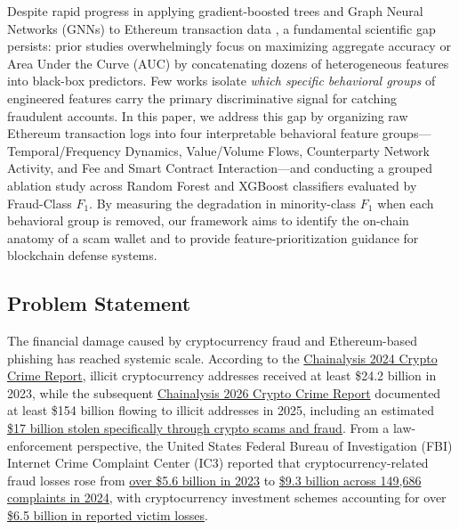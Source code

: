 \documentclass[conference]{IEEEtran}
\begin{document}
Despite rapid progress in applying gradient-boosted trees and Graph Neural Networks (GNNs) to Ethereum transaction data \cite{chen2020ijcai, li2022, zhang2024}, a fundamental scientific gap persists: prior studies overwhelmingly focus on maximizing aggregate accuracy or Area Under the Curve (AUC) by concatenating dozens of heterogeneous features into black-box predictors. Few works isolate \emph{which specific behavioral groups} of engineered features carry the primary discriminative signal for catching fraudulent accounts. In this paper, we address this gap by organizing raw Ethereum transaction logs into four interpretable behavioral feature groups---Temporal/Frequency Dynamics, Value/Volume Flows, Counterparty Network Activity, and Fee and Smart Contract Interaction---and conducting a grouped ablation study across Random Forest and XGBoost classifiers evaluated by Fraud-Class $F_1$. By measuring the degradation in minority-class $F_1$ when each behavioral group is removed, our framework aims to identify the on-chain anatomy of a scam wallet and to provide feature-prioritization guidance for blockchain defense systems.

\subsection{Problem Statement}
The financial damage caused by cryptocurrency fraud and Ethereum-based phishing has reached systemic scale. According to the \href{https://www.chainalysis.com/blog/2024-crypto-crime-report-introduction/}{Chainalysis 2024 Crypto Crime Report}, illicit cryptocurrency addresses received at least \$24.2 billion in 2023, while the subsequent \href{https://www.chainalysis.com/blog/2026-crypto-crime-report-introduction/}{Chainalysis 2026 Crypto Crime Report} documented at least \$154 billion flowing to illicit addresses in 2025, including an estimated \href{https://www.chainalysis.com/blog/crypto-scams-2026/}{\$17 billion stolen specifically through crypto scams and fraud}. From a law-enforcement perspective, the United States Federal Bureau of Investigation (FBI) Internet Crime Complaint Center (IC3) reported that cryptocurrency-related fraud losses rose from \href{https://www.fbi.gov/news/stories/2023-cryptocurrency-fraud-report-released}{over \$5.6 billion in 2023} to \href{https://www.trmlabs.com/resources/blog/a-record-breaking-year-for-cybercrime-key-findings-from-the-fbis-2024-ic3-report}{\$9.3 billion across 149,686 complaints in 2024}, with cryptocurrency investment schemes accounting for over \href{https://www.fbi.gov/news/press-releases/fbi-releases-annual-internet-crime-report}{\$6.5 billion in reported victim losses}.
\end{document}
